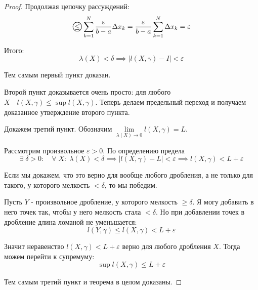 \documentclass[../main.tex]{subfiles}
\begin{document}
\begin{proof}
    Продолжая цепочку рассуждений:
    \[ \oleq \sum\limits_{ k=1}^{ N} \dfrac{ \varepsilon }{ b-a} \Delta x_k= \dfrac{ \varepsilon}{ b-a} \sum\limits_{ k=1}^{ N} \Delta x_k= \varepsilon \]

    Итого: 
    \[ \lambda \left( X\right)< \delta \implies  \left| l \left( X, \gamma \right)-I\right|< \varepsilon \]

    Тем самым первый пункт доказан. 

    Второй пункт доказывается очень просто: для любого \( X\quad l \left( X, \gamma \right) \leq \sup\limits_{ } l \left( X, \gamma \right)\). Теперь делаем предельный переход и получаем доказанное утверждение второго пункта. 

    Докажем третий пункт. Обозначим \( \lim\limits_{ \lambda \left( X\right)\rightarrow0} l \left( X, \gamma \right)=L\). 

    Рассмотрим произвольное \( \varepsilon >0\). По определению предела 
    \[ \exists \; \delta >0:\quad \forall \; X:\; \lambda \left( X\right) < \delta \implies \left| l \left( X, \gamma \right)-L\right|< \varepsilon \implies l \left( X, \gamma \right)<L+ \varepsilon \]

    Если мы докажем, что это верно для вообще любого дробления, а не только для такого, у которого мелкость \( < \delta \), то мы победим. 

    Пусть \( Y\) - произвольное дробление, у которого мелкость \( \geq \delta \). Я могу добавить в него точек так, чтобы у него мелкость стала \( < \delta \). Но при добавлении точек в дробление длина ломаной не уменьшается:
    \[ l \left( Y, \gamma \right) \leq l \left( X, \gamma \right)< L + \varepsilon \]

    Значит неравенство \( l \left( X, \gamma \right)< L + \varepsilon \) верно для любого дробления \( X\). Тогда можем перейти к супремуму:
    \[ \sup\limits_{ } l \left( X, \gamma \right) \leq L + \varepsilon \]

    Тем самым третий пункт и теорема в целом доказаны. 
\end{proof}
\end{document}
